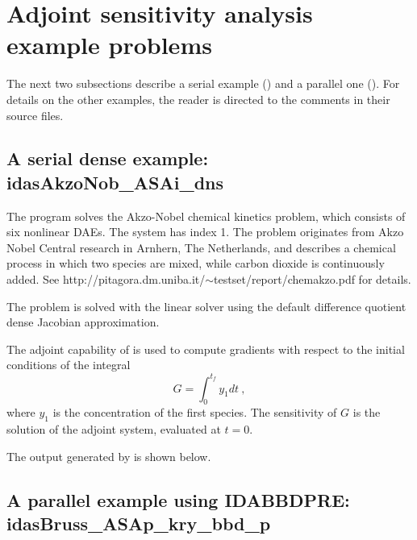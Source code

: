 \section{Adjoint sensitivity analysis example problems}\label{s:adj_examples}

The next two subsections describe a serial example () and
a parallel one ().
For details on the other examples, the reader is directed to the comments in their
source files.

\subsection{A serial dense example: idasAkzoNob\_ASAi\_dns}\label{ss:idasAkzoNob_ASAi_dns}

The  program solves the Akzo-Nobel chemical kinetics
problem, which consists of six nonlinear DAEs.  The system has index 1.
The problem originates from Akzo Nobel Central research in Arnhern,
The Netherlands, and describes a chemical process in which two species
are mixed, while carbon dioxide is continuously added.
See http://pitagora.dm.uniba.it/$\sim$testset/report/chemakzo.pdf for details.

The problem is solved with the {\idadense} linear solver using the
default difference quotient dense Jacobian approximation.

The adjoint capability of {\idas} is used to compute gradients with
respect to the initial conditions of the integral
\begin{equation*}
  G = \int_0^{t_f} y_1 dt ~,
\end{equation*}
where $y_1$ is the concentration of the first species.  The sensitivity
of $G$ is the solution of the adjoint system, evaluated at $t = 0$.

The output generated by  is shown below.




\subsection{A parallel example using IDABBDPRE: idasBruss\_ASAp\_kry\_bbd\_p}
\label{ss:idasBruss_ASAp_kry_bbd_p}

